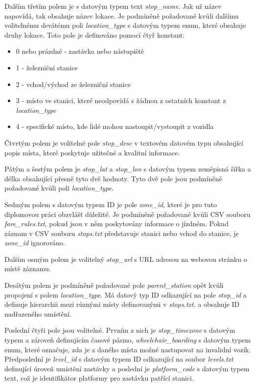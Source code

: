 Dalším třetím polem je s datovým typem text \textit{stop\_name}. Jak už název napovídá, tak obsahuje název lokace. 
Je podmíněně požadované kvůli dalšímu volitelnému devátému poli \textit{location\_type} s datovým typem enum, 
které obsahuje druhy lokace.
Toto pole je definováno pomocí čtyř konstant:
\begin{itemize} 
\item 0 nebo prázdné - zastávka nebo nástupiště
\item 1 - železniční stanice 
\item 2 - vchod/východ ze železniční stanice 
\item 3 - místo ve stanici, které neodpovídá s žádnou z ostatních konstant z \textit{location\_type} 
\item 4 - specifické místo, kde lidé mohou nastoupit/vystoupit z vozidla
\end{itemize}

Čtvrtým polem je volitelné pole \textit{stop\_desc} v textovém datovém typu obsahující popis místa, 
které poskytuje užitečné a kvalitní informace.

Pátým a šestým polem je \textit{stop\_lat} a \textit{stop\_lon} s datovým typem zeměpisná šířka a délka
obsahující přesně tyto dvě hodnoty. Tyto dvě pole jsou podmíněně požadované kvůli poli \textit{location\_type}.

Sedmým polem s datovým typem ID je pole \textit{zone\_id}, které je pro tuto diplomovou práci obzvlášť důležité.
Je podmíněně požadované kvůli CSV souboru \textit{fare\_rules.txt}, pokud jsou v něm poskytovány informace o jízdném.
Pokud záznam v CSV souboru \textit{stops.txt} představuje stanici nebo vchod do stanice, je \textit{zone\_id} ignorováno.

Dalším osmým polem je volitelný \textit{stop\_url} s URL adresou na webovou stránku o místě záznamu.

Desátým polem je podmíněně požadované pole \textit{parent\_station} opět kvůli propojení s polem \textit{location\_type}.
Má datový typ ID odkazující na pole \textit{stop\_id} a definuje hierarchii mezi různými místy definovanými v \textit{stops.txt}. 
a obsahuje ID nadřazeného umístění.

Poslední čtyři pole jsou volitelné. Prvním z nich je \textit{stop\_timezone} s datovým typem a zároveň definujícím časové
pásmo, \textit{wheelchair\_boarding} s datovým typem enum, které označuje, zda je z daného místa možné nastupovat na invalidní vozík.
Předposlední je \textit{level\_id} s datovým typem ID odkazující na soubor \textit{levels.txt} defi\-nující úroveň
umístění zastávky a poslední je \textit{platform\_code} s datovým typem text, 
což je identifikátor platformy pro zastávku patřící stanici.

